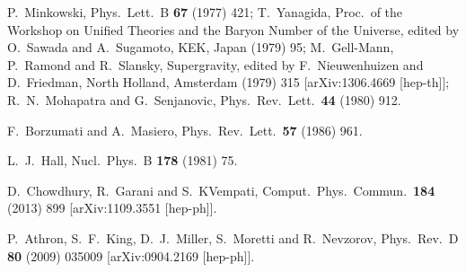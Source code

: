 \documentclass[final,3p,11pt,pdflatex]{elsarticle}
\newcommand{\ptitle}[1]{\emph{#1}}
\renewcommand{\ptitle}[1]{}
\begin{document}
\begin{thebibliography}{100}
  P.~Minkowski, \ptitle{
  $\mu \rightarrow e \gamma$ at a Rate of One Out of 1-Billion Muon Decays?,}
  Phys.\ Lett.\ B {\bf 67} (1977) 421;
  T.~Yanagida, \ptitle{
  Horizontal Symmetry And Masses Of Neutrinos,}
  Proc.\ of the
  Workshop on Unified Theories and the Baryon Number of the Universe,
  edited by O.~Sawada and A.~Sugamoto, KEK, Japan (1979) 95;
  M.~Gell-Mann, P.~Ramond and R.~Slansky, \ptitle{
  Complex Spinors and Unified Theories,}
  Supergravity, edited by F.~Nieuwenhuizen and
  D.~Friedman, North Holland, Amsterdam (1979) 315
  [arXiv:1306.4669 [hep-th]];
  R.~N.~Mohapatra and G.~Senjanovic, \ptitle{
  Neutrino Mass and Spontaneous Parity Nonconservation,}
  Phys.\ Rev.\ Lett.\  {\bf 44} (1980) 912.

  F.~Borzumati and A.~Masiero, \ptitle{
Large Muon- and electron-Number Nonconservation in Supergravity Theories,}
  Phys.\ Rev.\ Lett.\  {\bf 57} (1986) 961.

  L.~J.~Hall,
  Nucl.\ Phys.\ B {\bf 178} (1981) 75.

  D.~Chowdhury, R.~Garani and S.~KVempati,
  Comput.\ Phys.\ Commun.\  {\bf 184} (2013) 899
  [arXiv:1109.3551 [hep-ph]].

  P.~Athron, S.~F.~King, D.~J.~Miller, S.~Moretti and R.~Nevzorov,
  Phys.\ Rev.\ D {\bf 80} (2009) 035009
  [arXiv:0904.2169 [hep-ph]].


\end{thebibliography}
\end{document}
